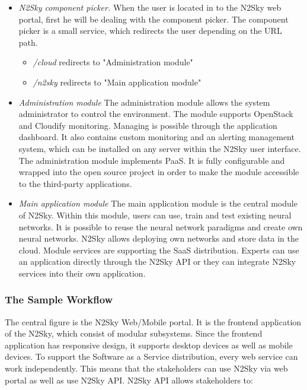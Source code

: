 \begin{itemize}
\item \emph{N2Sky component picker.} When the user is located in to the N2Sky web portal, first he will be dealing with the component picker. The component picker is a small service, which redirects the user depending on the URL path.
\begin{itemize}
\item \emph{/cloud} redirects to "Administration module"
\item \emph{/n2sky} redirects to "Main application module"
\end{itemize}


\item \emph{Administration module} The administration module allows the system administrator to control the environment. The module supports OpenStack and Cloudify monitoring. Managing is possible through the application dashboard. It also contains custom monitoring and an alerting management system, which can be installed on any server within the N2Sky user interface. The administration module implements PaaS. It is fully configurable and wrapped into the open source project in order to make the module accessible to the third-party applications. 
\item \emph{Main application module} The main application module is the central module of N2Sky. Within this module, users can use, train and test existing neural networks. It is possible to reuse the neural network paradigms and create own neural networks. N2Sky allows deploying own networks and store data in the cloud. Module services are supporting the SaaS distribution. Experts can use an application directly through the N2Sky API or they can integrate N2Sky services into their own application. 
\end{itemize}


\subsubsection{The Sample Workflow}


The central figure is the N2Sky Web/Mobile portal. It is the frontend application of the N2Sky, which consist of modular subsystems. Since the frontend application has responsive design, it supports desktop devices as well as mobile devices. 
To support the Software as a Service distribution, every web service can work independently. This means that the stakeholders can use N2Sky via web portal as well as use N2Sky API.
N2Sky API allows stakeholders to:


